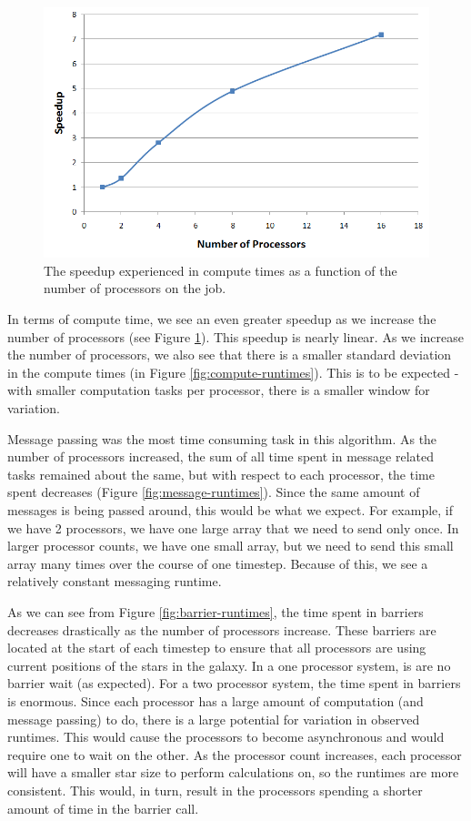 \documentclass{article}
\begin{document}
\begin{figure}
\centering
\includegraphics[width=\columnwidth]{speedups-compute.png}
\caption{The speedup experienced in compute times as a function of the number of processors on the job. \label{fig:speedups-compute}}
\end{figure} 

In terms of compute time, we see an even greater speedup as we increase the number of processors (see Figure \ref{fig:speedups-compute}).  This speedup is nearly linear.  As we increase the number of processors, we also see that there is a smaller standard deviation in the compute times (in Figure \ref{fig:compute-runtimes}).  This is to be expected - with smaller computation tasks per processor, there is a smaller window for variation. 

Message passing was the most time consuming task in this algorithm.  As the number of processors increased, the sum of all time spent in message related tasks remained about the same, but with respect to each processor, the time spent decreases (Figure \ref{fig:message-runtimes}).  Since the same amount of messages is being passed around, this would be what we expect.  For example, if we have 2 processors, we have one large array that we need to send only once.  In larger processor counts, we have one small array, but we need to send this small array many times over the course of one timestep.  Because of this, we see a relatively constant messaging runtime.

As we can see from Figure \ref{fig:barrier-runtimes}, the time spent in barriers decreases drastically as the number of processors increase.  These barriers are located at the start of each timestep to ensure that all processors are using current positions of the stars in the galaxy.  In a one processor system, is are no barrier wait (as expected).  For a two processor system, the time spent in barriers is enormous.  Since each processor has a large amount of computation (and message passing) to do, there is a large potential for variation in observed runtimes.  This would cause the processors to become asynchronous and would require one to wait on the other.  As the processor count increases, each processor will have a smaller star size to perform calculations on, so the runtimes are more consistent.  This would, in turn, result in the processors spending a shorter amount of time in the barrier call.
\end{document}
